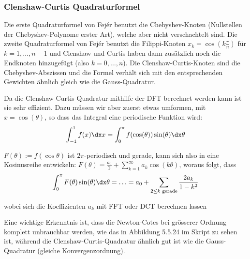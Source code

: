 \subsubsection{Clenshaw-Curtis Quadraturformel}
Die erste Quadraturformel von Fejér benutzt die Chebyshev-Knoten (Nullstellen der Chebyshev-Polynome erster Art), welche aber nicht verschachtelt sind.
Die zweite Quadraturformel von Fejér benutzt die Filippi-Knoten $x_k = \cos\left( k \frac{\pi}{n} \right)$ für $k = 1, \ldots, n - 1$
und Clenshaw und Curtis haben dann zusätzlich noch die Endknoten hinzugefügt (also $k = 0, \ldots, n$).
Die Clenshaw-Curtis-Knoten sind die Chebyshev-Abszissen und die Formel verhält sich mit den entsprechenden Gewichten ähnlich gleich wie die Gauss-Quadratur.

Da die Clenshaw-Curtis-Quadratur mithilfe der DFT berechnet werden kann ist sie sehr effizient.
Dazu müssen wir aber zuerst etwas umformen, mit $x = \cos(\theta)$, so dass das Integral eine periodische Funktion wird:
\rmvspace
\begin{align*}
    \int_{-1}^{1} f(x) \dx x = \int_{0}^{\pi} f(\cos(\theta)) \sin(\theta) \dx \theta
\end{align*}

\drmvspace
$F(\theta) := f(\cos\theta)$ ist $2 \pi$-periodisch und gerade, kann sich also in eine Kosinusreihe entwickeln: $F(\theta) = \frac{a_0}{2} + \sum_{k = 1}^{\infty} a_k \cos(k \theta)$, woraus folgt, dass
\drmvspace
\begin{align*}
    \int_{0}^{\pi} F(\theta) \sin(\theta) \dx \theta = \ldots = a_0 + \sum_{2 \leq k \text{ gerade}} \frac{2a_k}{1 - k^2}
\end{align*}

\drmvspace
wobei sich die Koeffizienten $a_k$ mit FFT oder DCT berechnen lassen


Eine wichtige Erkenntnis ist, dass die Newton-Cotes bei grösserer Ordnung komplett unbrauchbar werden, wie das in Abbildung 5.5.24 im Skript zu sehen ist,
während die Clenshaw-Curtis-Quadratur ähnlich gut ist wie die Gauss-Quadratur (gleiche Konvergenzordnung).

